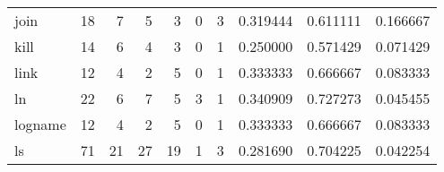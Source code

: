 \begin{longtable}{lrrrrrrrrr}
join      &                                      18 &                                                  7 &                                                  5 &                                                  3 &                                                  0 &                                                  3 &                                           0.319444 &                               0.611111 &                             0.166667 \\
kill      &                                      14 &                                                  6 &                                                  4 &                                                  3 &                                                  0 &                                                  1 &                                           0.250000 &                               0.571429 &                             0.071429 \\
link      &                                      12 &                                                  4 &                                                  2 &                                                  5 &                                                  0 &                                                  1 &                                           0.333333 &                               0.666667 &                             0.083333 \\
ln        &                                      22 &                                                  6 &                                                  7 &                                                  5 &                                                  3 &                                                  1 &                                           0.340909 &                               0.727273 &                             0.045455 \\
logname   &                                      12 &                                                  4 &                                                  2 &                                                  5 &                                                  0 &                                                  1 &                                           0.333333 &                               0.666667 &                             0.083333 \\
ls        &                                      71 &                                                 21 &                                                 27 &                                                 19 &                                                  1 &                                                  3 &                                           0.281690 &                               0.704225 &                             0.042254 \\

\end{longtable}
